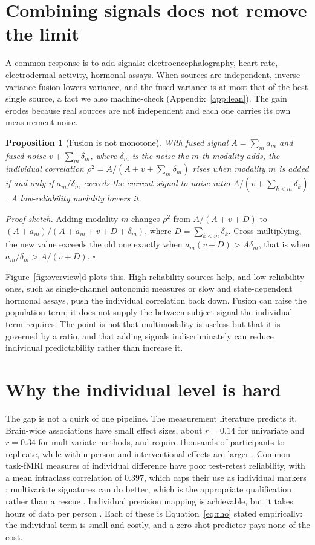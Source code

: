\documentclass{article}
\newtheorem{proposition}{Proposition}
\begin{document}
\section{Combining signals does not remove the limit}
\label{sec:fusion}
A common response is to add signals: electroencephalography, heart rate, electrodermal activity, hormonal
assays. When sources are independent, inverse-variance fusion lowers variance, and the fused variance is at
most that of the best single source, a fact we also machine-check (Appendix~\ref{app:lean}). The gain erodes
because real sources are not independent and each one carries its own measurement noise.

\begin{proposition}[Fusion is not monotone]\label{prop:fusion}
With fused signal $A=\sum_m a_m$ and fused noise $v+\sum_m\delta_m$, where $\delta_m$ is the noise the
$m$-th modality adds, the individual correlation $\rho^2=A/(A+v+\sum_m\delta_m)$ rises when modality $m$ is
added if and only if $a_m/\delta_m$ exceeds the current signal-to-noise ratio $A/(v+\sum_{k<m}\delta_k)$. A
low-reliability modality lowers it.
\end{proposition}
\noindent\emph{Proof sketch.} Adding modality $m$ changes $\rho^2$ from $A/(A+v+D)$ to
$(A+a_m)/(A+a_m+v+D+\delta_m)$, where $D=\sum_{k<m}\delta_k$. Cross-multiplying, the new value exceeds the
old one exactly when $a_m(v+D)>A\delta_m$, that is when $a_m/\delta_m>A/(v+D)$. \hfill$\square$

Figure~\ref{fig:overview}d plots this. High-reliability sources help, and low-reliability ones, such as
single-channel autonomic measures or slow and state-dependent hormonal assays, push the individual
correlation back down. Fusion can raise the population term; it does not supply the between-subject signal
the individual term requires. The point is not that multimodality is useless but that it is governed by a
ratio, and that adding signals indiscriminately can reduce individual predictability rather than increase it.

\section{Why the individual level is hard}
\label{sec:reliability}
The gap is not a quirk of one pipeline. The measurement literature predicts it. Brain-wide associations have
small effect sizes, about $r=0.14$ for univariate and $r=0.34$ for multivariate methods, and require
thousands of participants to replicate, while within-person and interventional effects are larger
\citep{marek2022,kang2024}. Common task-fMRI measures of individual difference have poor test-retest
reliability, with a mean intraclass correlation of $0.397$, which caps their use as individual markers
\citep{elliott2020}; multivariate signatures can do better, which is the appropriate qualification rather
than a rescue \citep{kragel2021}. Individual precision mapping is achievable, but it takes hours of data per
person \citep{gordon2017,du2025}. Each of these is Equation~\ref{eq:rho} stated empirically: the individual
term is small and costly, and a zero-shot predictor pays none of the cost.
\end{document}
